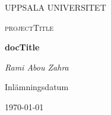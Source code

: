 \begin{titlepage}

  \centering
	{\scshape\LARGE UPPSALA UNIVERSITET\par}
	\vspace{1cm}
  {\scshape\Large {projectTitle} \par}
	\vspace{1.5cm}
  {\huge\bfseries {docTitle} \par}
	\vspace{2cm}
	{\Large\itshape Rami Abou Zahra \par}
	\vfill
  \vfill


  {\large Inlämningsdatum}\par
  {\today}

\end{titlepage}
